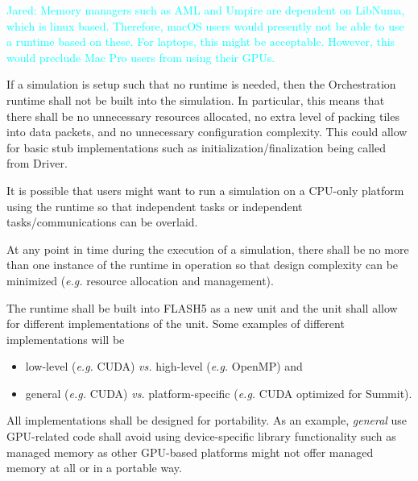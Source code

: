 \documentclass{article}
\newcommand{\Jared}[1]          {\textcolor{cyan}{Jared: #1}}
\begin{document}
\Jared{Memory managers such as AML and Umpire are dependent on
LibNuma, which is linux based.  Therefore, macOS users would presently not be
able to use a runtime based on these.  For laptops, this might be acceptable.
However, this would preclude Mac Pro users from using their GPUs.}

\begin{req}
If a simulation is setup such that no runtime is needed, then the Orchestration
runtime shall not be built into the simulation.  In particular, this means that
there shall be no unnecessary resources allocated, no extra level of packing
tiles into data packets, and no unnecessary configuration complexity.  This
could allow for basic stub implementations such as initialization/finalization
being called from Driver.  
\end{req}

It is possible that users might want to run a simulation on a CPU-only platform
using the runtime so that independent tasks or independent tasks/communications
can be overlaid.

\begin{req}
At any point in time during the execution of a simulation, there shall be no more
than one instance of the runtime in operation so that design complexity can
be minimized (\textit{e.g.} resource allocation and management).
\end{req}

\begin{req}
\label{req:UnitImplementations}
The runtime shall be built into FLASH5 as a new unit and the unit shall allow
for different implementations of the unit.  Some examples of different
implementations will be
\begin{itemize}
\item{low-level (\textit{e.g.} CUDA) \textit{vs.} high-level
(\textit{e.g.} OpenMP) and}
\item{general (\textit{e.g.} CUDA) \textit{vs.}} platform-specific
(\textit{e.g.} CUDA optimized for Summit).
\end{itemize}
\end{req}

\begin{req}
\label{req:Portability}
All implementations shall be designed for portability.  As an example,
\textit{general} use GPU-related code shall avoid using device-specific library
functionality such as managed memory as other GPU-based platforms might not
offer managed memory at all or in a portable way.
\end{req}
\end{document}
